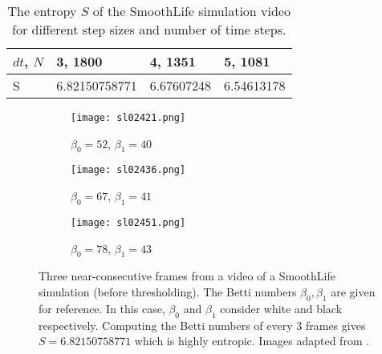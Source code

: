 \begin{table}[h]
	\caption{The entropy $S$ of the SmoothLife simulation video for different step sizes and number of time steps.} \label{tab:smoothlife}
	\centering
	\renewcommand{\arraystretch}{1.5}
	\begin{tabular}{l | l l l }
	$dt$, $N$		& 3, 1800			& 4, 1351			& 5, 1081 \\
	\hline
	S			& 6.82150758771	& 6.67607248		& 6.54613178
	\end{tabular}
\end{table}%

\begin{figure}[h]
	\centering
	\begin{subfigure}[b]{0.3\textwidth}
		\texttt{[image: sl02421.png]}
		\caption{$\beta_0 = 52$, $\beta_1 = 40$} \label{fig:sl2421}
	\end{subfigure} \quad
	\begin{subfigure}[b]{0.3\textwidth}
		\texttt{[image: sl02436.png]}
		\caption{$\beta_0 = 67$, $\beta_1 = 41$} \label{fig:sl02436}
	\end{subfigure} \quad
	\begin{subfigure}[b]{0.3\textwidth}
		\texttt{[image: sl02451.png]}
		\caption{$\beta_0 = 78$, $\beta_1 = 43$} \label{fig:sl02451}
	\end{subfigure}
	\caption{Three near-consecutive frames from a video of a SmoothLife simulation (before thresholding). The Betti numbers $\beta_0, \beta_1$ are given for reference. In this case, $\beta_0$ and $\beta_1$ consider white and black respectively. Computing the Betti numbers of every 3 frames gives $S = 6.82150758771$ which is highly entropic. Images adapted from \protect{}.} \label{fig:smoothlife}
\end{figure}